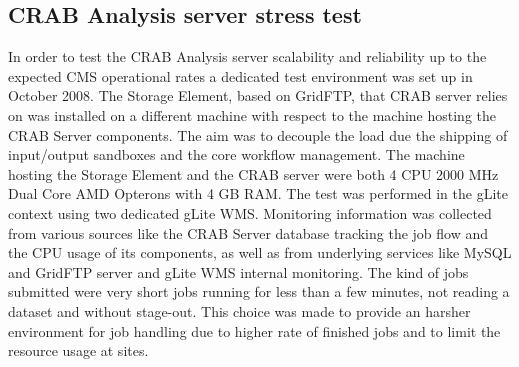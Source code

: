 \subsection{CRAB Analysis server stress test}
In order to test the CRAB Analysis server scalability and reliability up to
the expected CMS operational rates a dedicated test environment was
set up in October 2008. The Storage Element, based on GridFTP, 
that CRAB server relies on was installed on a different machine with 
respect to the machine hosting the CRAB Server components. The aim was 
to decouple the load
due the shipping of input/output sandboxes and the core workflow
management. The machine hosting the Storage Element and the CRAB
server were both 4 CPU 2000 MHz Dual Core AMD Opterons with 4 GB
RAM. The test was performed in the gLite context using two dedicated
gLite WMS. Monitoring information was collected from various sources
like the CRAB Server database tracking the job flow and the CPU usage
of its components, as well as from underlying services like MySQL and
GridFTP server and gLite WMS internal monitoring. The kind of
jobs submitted were very short jobs running for less than a few
minutes, not reading a dataset and without stage-out. This choice was
made to provide an harsher environment for job handling due to higher
rate of finished jobs and to limit the resource usage at sites.

%
%

